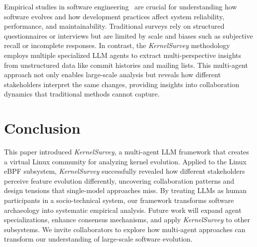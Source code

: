 \documentclass[sigconf,review,anonymous]{acmart}
\newcommand{\sys}{\textit{KernelSurvey}\xspace}
\begin{document}
Empirical studies in software engineering~\cite{perry2000empirical} are crucial for understanding how software evolves and how development practices affect system reliability, performance, and maintainability. Traditional surveys rely on structured questionnaires or interviews but are limited by scale and biases such as subjective recall or incomplete responses. In contrast, the \sys methodology employs multiple specialized LLM agents to extract multi-perspective insights from unstructured data like commit histories and mailing lists. This multi-agent approach not only enables large-scale analysis but reveals how different stakeholders interpret the same changes, providing insights into collaboration dynamics that traditional methods cannot capture.






\section{Conclusion}

This paper introduced \sys, a multi-agent LLM framework that creates a virtual Linux community for analyzing kernel evolution. Applied to the Linux eBPF subsystem, \sys successfully revealed how different stakeholders perceive feature evolution differently, uncovering collaboration patterns and design tensions that single-model approaches miss. By treating LLMs as human participants in a socio-technical system, our framework transforms software archaeology into systematic empirical analysis. Future work will expand agent specializations, enhance consensus mechanisms, and apply \sys to other subsystems. We invite collaborators to explore how multi-agent approaches can transform our understanding of large-scale software evolution.
\end{document}
